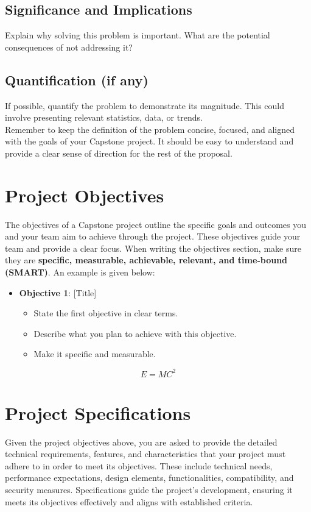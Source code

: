 \subsection{Significance and Implications} Explain why solving this problem is important.
What are the potential consequences of not addressing it?


\subsection{Quantification (if any)}
If possible, quantify the problem to demonstrate its magnitude. This could involve presenting relevant statistics, data, or trends.\\


\noindent Remember to keep the definition of the problem concise, focused, and aligned with the goals of your Capstone project. It should be easy to understand and provide a clear sense of direction for the rest of the proposal.

\section{Project Objectives}
The objectives of a Capstone project outline the specific goals and outcomes you and your team aim to achieve through the project. These objectives guide your team and provide a clear focus. When writing the objectives section, make sure they are \textbf{specific, measurable, achievable, relevant, and time-bound (SMART)}. An example is given
below:
\begin{itemize}
\item \textbf{Objective 1}: [Title]
      \begin{itemize}
        \item State the first objective in clear terms.
        \item Describe what you plan to achieve with this objective.
        \item Make it specific and measurable.
      \end{itemize}
\end{itemize}

\begin{equation}\label{eq:EMC}
E = MC^2
\end{equation}


\section{Project Specifications}
Given the project objectives above, you are asked to provide the detailed technical requirements, features, and characteristics that your project must adhere to in order to meet its objectives. These include technical needs, performance expectations, design elements, functionalities, compatibility, and security measures. Specifications guide the project's development, ensuring it meets its objectives effectively and aligns with established criteria.


